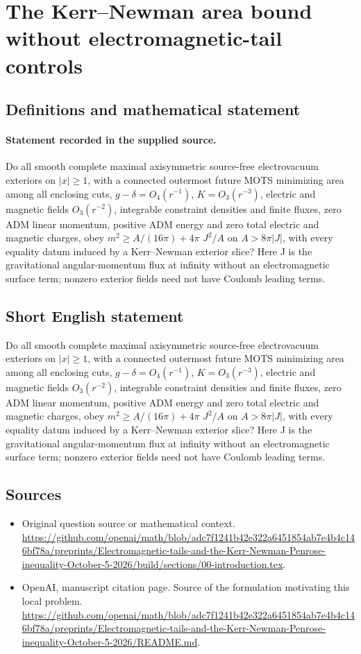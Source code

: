 \documentclass[11pt]{article}
\begin{document}
\section*{The Kerr–Newman area bound without electromagnetic-tail controls}\label{statement}
\subsection{Definitions and mathematical statement}
\paragraph{Statement recorded in the supplied source.}
Do all smooth complete maximal axisymmetric source-free electrovacuum exteriors on ${|x|\geq 1}$, with a connected outermost future MOTS minimizing area among all enclosing cuts, $g-\delta =O_4(r^{-1})$, $K=O_3(r^{-3})$, electric and magnetic fields $O_3(r^{-2})$, integrable constraint densities and finite fluxes, zero ADM linear momentum, positive ADM energy and zero total electric and magnetic charges, obey $m^2\geq A/(16\pi )+4\pi $ $J^2/A$ on $A>8\pi |J|$, with every equality datum induced by a Kerr–Newman exterior slice? Here J is the gravitational angular-momentum flux at infinity without an electromagnetic surface term; nonzero exterior fields need not have Coulomb leading terms.
\subsection{Short English statement}
Do all smooth complete maximal axisymmetric source-free electrovacuum exteriors on ${|x|\geq 1}$, with a connected outermost future MOTS minimizing area among all enclosing cuts, $g-\delta =O_4(r^{-1})$, $K=O_3(r^{-3})$, electric and magnetic fields $O_3(r^{-2})$, integrable constraint densities and finite fluxes, zero ADM linear momentum, positive ADM energy and zero total electric and magnetic charges, obey $m^2\geq A/(16\pi )+4\pi $ $J^2/A$ on $A>8\pi |J|$, with every equality datum induced by a Kerr–Newman exterior slice? Here J is the gravitational angular-momentum flux at infinity without an electromagnetic surface term; nonzero exterior fields need not have Coulomb leading terms.
\subsection{Sources}
\begin{itemize}
\item[S1] Original question source or mathematical context.
\url{https://github.com/openai/math/blob/adc7f1241b42e322a6451854ab7e4b4c146bf78a/preprints/Electromagnetic-tails-and-the-Kerr-Newman-Penrose-inequality-October-5-2026/build/sections/00-introduction.tex}.
\item[S2] OpenAI, manuscript citation page. Source of the formulation motivating this local problem.
\url{https://github.com/openai/math/blob/adc7f1241b42e322a6451854ab7e4b4c146bf78a/preprints/Electromagnetic-tails-and-the-Kerr-Newman-Penrose-inequality-October-5-2026/README.md}.
\end{itemize}
\end{document}
